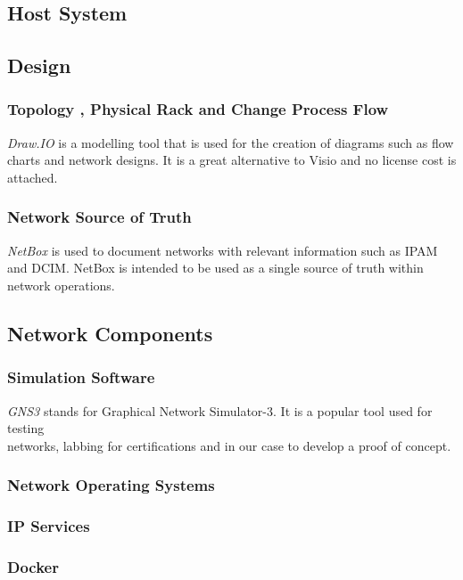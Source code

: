 \documentclass[12pt, letterpaper]{article}
\begin{document}
	\subsection{Host System}
	
	\subsection{Design}
	
		\subsubsection{Topology , Physical Rack and Change Process Flow}
\textit{Draw.IO} is a modelling tool that is used for the creation of diagrams such as flow charts and network designs. It is a great alternative to Visio and no license cost is attached.

		\subsubsection{Network Source of Truth}
\textit{NetBox} is used to document networks with relevant information such as IPAM and DCIM. NetBox is intended to be used as a single source of truth within network operations.
	
	\subsection{Network Components}
		\subsubsection{Simulation Software}
\textit{GNS3} stands for Graphical Network Simulator-3. It is a popular tool used for testing \\ networks, labbing for certifications and in our  case to develop a proof of concept.
 
		\subsubsection{Network Operating Systems}
		\subsubsection{IP Services}
		\subsubsection{Docker}
		
\end{document}

